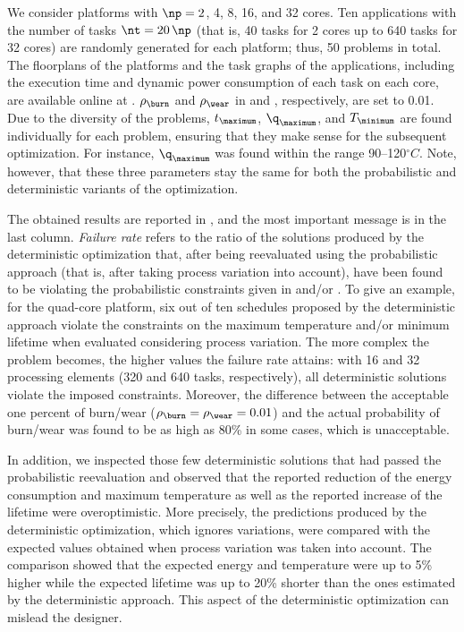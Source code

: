 We consider platforms with $\np = 2$, 4, 8, 16, and 32 cores. Ten applications
with the number of tasks $\nt = 20 \, \np$ (that is, 40 tasks for 2 cores up to
640 tasks for 32 cores) are randomly generated for each platform; thus, 50
problems in total. The floorplans of the platforms and the task graphs of the
applications, including the execution time and dynamic power consumption of each
task on each core, are available online at \cite{sources}. $\rho_\burn$ and
$\rho_\wear$ in  and ,
respectively, are set to 0.01. Due to the diversity of the problems,
$t_\maximum$, $\q_\maximum$, and $T_\minimum$ are found individually for each
problem, ensuring that they make sense for the subsequent optimization. For
instance, $\q_\maximum$ was found within the range 90--120${}^\circ{}C$. Note,
however, that these three parameters stay the same for both the probabilistic
and deterministic variants of the optimization.

The obtained results are reported in , and the most important
message is in the last column. \emph{Failure rate} refers to the ratio of the
solutions produced by the deterministic optimization that, after being
reevaluated using the probabilistic approach (that is, after taking process
variation into account), have been found to be violating the probabilistic
constraints given in  and/or
. To give an example, for the quad-core platform,
six out of ten schedules proposed by the deterministic approach violate the
constraints on the maximum temperature and/or minimum lifetime when evaluated
considering process variation. The more complex the problem becomes, the higher
values the failure rate attains: with 16 and 32 processing elements (320 and 640
tasks, respectively), all deterministic solutions violate the imposed
constraints. Moreover, the difference between the acceptable one percent of
burn/wear ($\rho_\burn = \rho_\wear = 0.01$) and the actual probability of
burn/wear was found to be as high as 80\% in some cases, which is unacceptable.

In addition, we inspected those few deterministic solutions that had passed the
probabilistic reevaluation and observed that the reported reduction of the
energy consumption and maximum temperature as well as the reported increase of
the lifetime were overoptimistic. More precisely, the predictions produced by
the deterministic optimization, which ignores variations, were compared with the
expected values obtained when process variation was taken into account. The
comparison showed that the expected energy and temperature were up to 5\% higher
while the expected lifetime was up to 20\% shorter than the ones estimated by
the deterministic approach. This aspect of the deterministic optimization can
mislead the designer.

